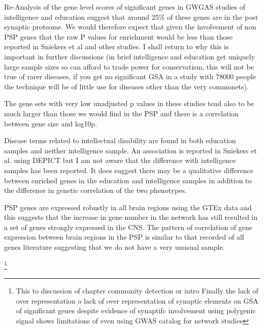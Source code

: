 Re-Analysis of the gene level scores of significant genes in GWGAS studies of intelligence and education suggest that around 25\% of these genes are in the post synaptic proteome. We would therefore expect that given the involvement of non PSP genes that the raw P values for enrichment would be less than those reported in Sniekers et al and other studies. I shall return to why this is important in further discussions (in brief intelligence and education get uniquely large sample sizes so can afford to trade power for conservatism, this will not be true of rarer diseases, if you get no significant GSA in a study with 78000 people the technique will be of little use for diseases other than the very commonets). 

The gene sets with very low unadjusted p values in these studies tend also to be much larger than those we would find in the PSP and there is a correlation between gene size and log10p.

Disease terms related to intellectual disability are found in both education samples and neither intelligence sample. An association is reported in Sniekers et al. \cite{sniekers2017genome} using DEPICT but I am not aware that the difference with intelligence samples has been reported. It does suggest there may be a qualitative difference between enriched genes in the education and intelligence samples in addition to the difference in genetic correlation of the two phenotypes.  

PSP genes are expressed robustly in all brain regions using the GTEx data and this suggests that the increase in gene number in the network has still resulted in a set of genes strongly expressed in the CNS. The pattern of correlation of gene expression between brain regions in the PSP is similar to that recorded of all genes literature \cite{mele2015human} suggesting that we do not have a very unusual sample.  

\footnote{This to discussion of chapter community detection or intro Finally the lack of over representation o
lack of over representation of synaptic elements on GSA of significant genes despite evidence of synaptifc involvement using polygenic signal shows limitations of even using GWAS catalog for network studies}








